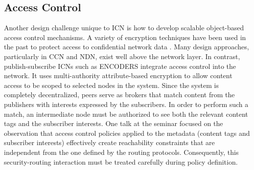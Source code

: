 \subsection{Access Control}
Another design challenge unique to ICN is how to develop scalable object-based
access control mechanisms. A variety of encryption techniques have been used
in the past to protect access to confidential network data \cite{tourani2016security}.
Many design approaches, particularly in CCN and NDN, exist well above the network
layer. In contrast, publish-subscribe ICNs such as ENCODERS \cite{raykova2015decentralized} integrate
access control into the network. It uses multi-authority attribute-based encryption
to allow content access to be scoped to selected nodes in the system. Since the
system is completely decentralized, peers serve as brokers that match content from
the publishers with interests expressed by the subscribers. In order to perform such a match,
an intermediate node must be authorized to see both the relevant content tags and
the subscriber interests. One talk at the seminar focused on the observation that
access control policies applied to the metadata (content tags and subscriber interests)
effectively create reachability constraints that are independent from the one defined by
the routing protocols. Consequently, this security-routing interaction must be
treated carefully during policy definition.
